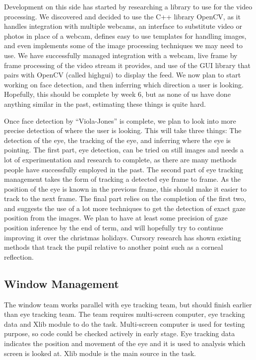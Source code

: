 \documentclass{article}
\begin{document}
Development on this side has started by researching a library to use for the video processing. We discovered and decided to use the C++ library OpenCV, as it handles integration with multiple webcams, an interface to substitute video or photos in place of a webcam, defines easy to use templates for handling images, and even implements some of the image processing techniques we may need to use. We have successfully managed integration with a webcam, live frame by frame processing of the video stream it provides, and use of the GUI library that pairs with OpenCV (called highgui) to display the feed. We now plan to start working on face detection, and then inferring which direction a user is looking. Hopefully, this should be complete by week 6, but as none of us have done anything similar in the past, estimating these things is quite hard.

Once face detection by “Viola-Jones” is complete, we plan to look into more precise detection of where the user is looking. This will take three things: The detection of the eye, the tracking of the eye, and inferring where the eye is pointing. The first part, eye detection, can be tried on still images and needs a lot of experimentation and research to complete, as there are many methods people have successfully employed in the past. The second part of eye tracking management takes the form of tracking a detected eye frame to frame. As the position of the eye is known in the previous frame, this should make it easier to track to the next frame. The final part relies on the completion of the first two, and suggests the use of a lot more techniques to get the detection of exact gaze position from the images. We plan to have at least some precision of gaze position inference by the end of term, and will hopefully try to continue improving it over the christmas holidays. Cursory research has shown existing methods that track the pupil relative to another point such as a corneal reflection.

\subsection*{Window Management}
The window team works parallel with eye tracking team, but should finish earlier than eye tracking team. The team requires multi-screen computer, eye tracking data and Xlib module to do the task. Multi-screen computer is used for testing purpose, so code could be checked actively in early stage. Eye tracking data indicates the position and movement of the eye and it is used to analysis which screen is looked at. Xlib module is the main source in the task.
\end{document}
